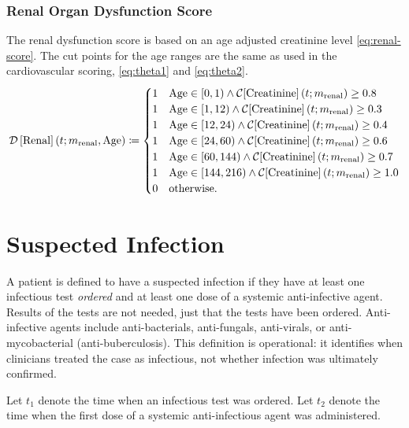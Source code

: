 \documentclass[letterpaper,10pt]{article}
\begin{document}
\subsubsection{Renal Organ Dysfunction Score}\label{sec:renal-odss}
The renal dysfunction score is based on an age adjusted creatinine level
\eqref{eq:renal-score}.  The cut points for the age ranges are the same as used
in the cardiovascular scoring, \eqref{eq:theta1} and \eqref{eq:theta2}.
\begin{equation}
  \label{eq:renal-score}
  \DS{Renal}[\m{renal}, \mathrm{Age}] \coloneqq
  \begin{cases}
    1 & \mathrm{Age} \in [  0,   1) \wedge \CF{Creatinine}[\m{renal}] \geq 0.8 \\
    1 & \mathrm{Age} \in [  1,  12) \wedge \CF{Creatinine}[\m{renal}] \geq 0.3 \\
    1 & \mathrm{Age} \in [ 12,  24) \wedge \CF{Creatinine}[\m{renal}] \geq 0.4 \\
    1 & \mathrm{Age} \in [ 24,  60) \wedge \CF{Creatinine}[\m{renal}] \geq 0.6 \\
    1 & \mathrm{Age} \in [ 60, 144) \wedge \CF{Creatinine}[\m{renal}] \geq 0.7 \\
    1 & \mathrm{Age} \in [144, 216) \wedge \CF{Creatinine}[\m{renal}] \geq 1.0 \\
    0 & \text{otherwise.}
  \end{cases}
\end{equation}

\section{Suspected Infection}\label{sec:suspected-infection}

A patient is defined to have a suspected infection if they have at least
one infectious test \emph{ordered} and at least one dose of a systemic
anti-infective agent. Results of the tests are not needed, just that the
tests have been ordered. Anti-infective agents include anti-bacterials,
anti-fungals, anti-virals, or anti-mycobacterial (anti-buberculosis). This
definition is operational: it identifies when clinicians treated the case as
infectious, not whether infection was ultimately confirmed.

Let $t_{1}$ denote the time when an infectious
test was ordered. Let $t_{2}$ denote the time when the first dose of
a systemic anti-infectious agent was administered.
\end{document}
